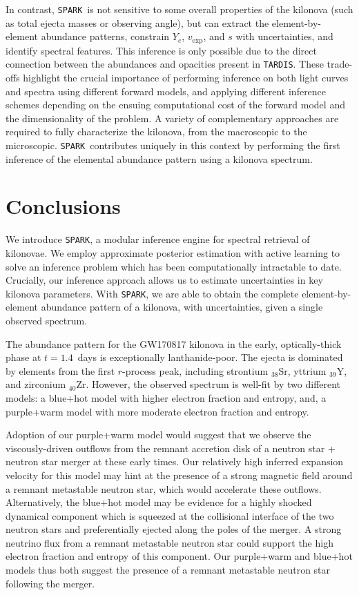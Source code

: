 \documentclass[twocolumn, twocolappendix]{aastex63}
\def\SPARK{\texttt{SPARK}}
\def\TARDIS{\texttt{TARDIS}}
\begin{document}
In contrast, \SPARK~is not sensitive to some overall properties of the kilonova (such as total ejecta masses or observing angle), but can extract the element-by-element abundance patterns, constrain $Y_e$, $v_{\mathrm{exp}}$, and $s$ with uncertainties, and identify spectral features. This inference is only possible due to the direct connection between the abundances and opacities present in \TARDIS. These trade-offs highlight the crucial importance of performing inference on both light curves and spectra using different forward models, and applying different inference schemes depending on the ensuing computational cost of the forward model and the dimensionality of the problem. A variety of complementary approaches are required to fully characterize the kilonova, from the macroscopic to the microscopic. \SPARK~contributes uniquely in this context by performing the first inference of the elemental abundance pattern using a kilonova spectrum.


\section{Conclusions}\label{sec:conclusions}

We introduce \SPARK, a modular inference engine for spectral retrieval of kilonovae. We employ approximate posterior estimation with active learning to solve an inference problem which has been computationally intractable to date. Crucially, our inference approach allows us to estimate uncertainties in key kilonova parameters. With \SPARK, we are able to obtain the complete element-by-element abundance pattern of a kilonova, with uncertainties, given a single observed spectrum. 

The abundance pattern for the GW170817 kilonova in the early, optically-thick phase at $t=1.4$~days is exceptionally lanthanide-poor. The ejecta is dominated by elements from the first $r$-process peak, including strontium ${}_{38}$Sr, yttrium ${}_{39}$Y, and zirconium ${}_{40}$Zr. However, the observed spectrum is well-fit by two different models: a blue+hot model with higher electron fraction and entropy, and, a purple+warm model with more moderate electron fraction and entropy. 

Adoption of our purple+warm model would suggest that we observe the viscously-driven outflows from the remnant accretion disk of a neutron star + neutron star merger at these early times. Our relatively high inferred expansion velocity for this model may hint at the presence of a strong magnetic field around a remnant metastable neutron star, which would accelerate these outflows. Alternatively, the blue+hot model may be evidence for a highly shocked dynamical component which is squeezed at the collisional interface of the two neutron stars and preferentially ejected along the poles of the merger. A strong neutrino flux from a remnant metastable neutron star could support the high electron fraction and entropy of this component. Our purple+warm and blue+hot models thus both suggest the presence of a remnant metastable neutron star following the merger.
\end{document}
